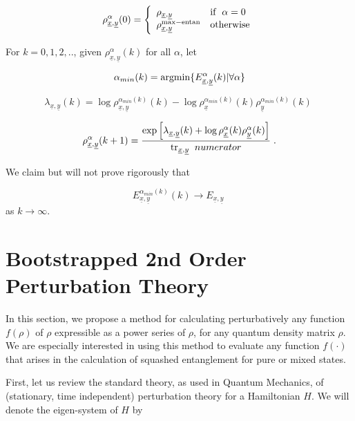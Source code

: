 \documentclass[12pt]{article}%
\newcommand{\tr}[0]{{\rm tr }}
\newcommand{\beq}{\begin{equation}}
\newcommand{\eeq}{\end{equation}}
\newcommand{\ul}[1]{\underline{#1}}
\newcommand{\rvx}[0]{{\ul{x}}}
\newcommand{\rvy}[0]{{\ul{y}}}
\newcommand{\lam}[0]{\lambda}
\newcommand{\alp}[0]{{\alpha}}
\begin{document}
\beq
\rho^{\alp}_{\rvx,\rvy}(0)=
\left\{
\begin{array}{ll}
\rho_{\rvx,\rvy}&{\rm if}\;\; \alp=0\\
\rho^{\rm max-entan}_{\rvx,\rvy}&{\rm otherwise}
\end{array}
\right.
\eeq



For $k=0,1,2, ..$, given $\rho^{\alp}_{\rvx,\rvy}(k)$ for all $\alp$, let

\beq
\alp_{min}(k) ={\rm argmin}\{E^{\alp}_{\rvx, \rvy}(k)|\forall\alp\}
\eeq

\beq
\lam_{\rvx, \rvy}(k)
=
\log \rho^{\alp_{min}(k)}_{\rvx,\rvy}(k)
-
\log \rho^{\alp_{min}(k)}_{\rvx}(k)
\rho^{\alp_{min}(k)}_{\rvy}(k)
\;
\eeq

\beq
\rho^{\alp}_{\rvx,\rvy}(k+1)
=
\frac{\exp\left[
\lam_{\rvx, \rvy}(k)
+
\log \rho^{\alp}_{\rvx}(k)
\rho^{\alp}_{\rvy}(k)
\right]}{\tr_{\rvx, \rvy} \;\;numerator}
\;.
\eeq

We claim but will not prove rigorously that

\beq
E_{\rvx, \rvy}^{\alp_{min}(k)}(k)\rightarrow
E_{\rvx, \rvy}
\;
\eeq
as $k\rightarrow \infty$.




























\section{Bootstrapped 2nd Order Perturbation Theory}

In this section, we
propose a method for calculating perturbatively
any function $f(\rho)$ of $\rho$
 expressible
as a power series of $\rho$, for any quantum density
matrix $\rho$. We are especially interested
in using this method
to evaluate any function  $f(\cdot)$
that arises in the calculation of
squashed entanglement for pure or mixed states.

First, let us review the standard theory,
as used in Quantum Mechanics, of
(stationary, time independent)
 perturbation theory for a Hamiltonian $H$.
 We will denote the eigen-system
 of $H$ by
\end{document}
